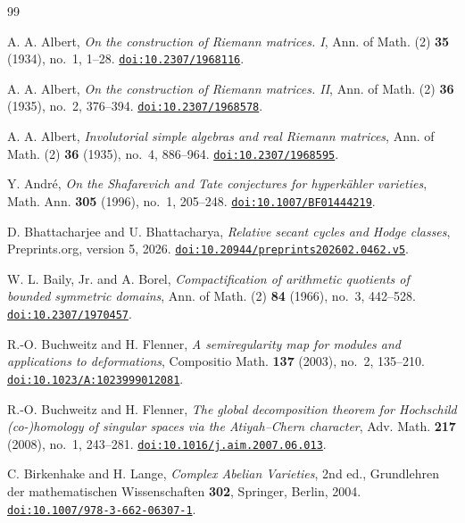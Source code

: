 \begin{thebibliography}{99}

A. A. Albert,
\emph{On the construction of Riemann matrices. I},
Ann. of Math. (2) \textbf{35} (1934), no.~1, 1--28.
\href{https://doi.org/10.2307/1968116}{\texttt{doi:10.2307/1968116}}.

A. A. Albert,
\emph{On the construction of Riemann matrices. II},
Ann. of Math. (2) \textbf{36} (1935), no.~2, 376--394.
\href{https://doi.org/10.2307/1968578}{\texttt{doi:10.2307/1968578}}.

A. A. Albert,
\emph{Involutorial simple algebras and real Riemann matrices},
Ann. of Math. (2) \textbf{36} (1935), no.~4, 886--964.
\href{https://doi.org/10.2307/1968595}{\texttt{doi:10.2307/1968595}}.

Y. Andr\'e,
\emph{On the Shafarevich and Tate conjectures for hyperk\"ahler varieties},
Math. Ann. \textbf{305} (1996), no.~1, 205--248.
\href{https://doi.org/10.1007/BF01444219}{\texttt{doi:10.1007/BF01444219}}.

D. Bhattacharjee and U. Bhattacharya,
\emph{Relative secant cycles and Hodge classes},
Preprints.org, version 5, 2026.
\href{https://doi.org/10.20944/preprints202602.0462.v5}{\texttt{doi:10.20944/preprints202602.0462.v5}}.

W. L. Baily, Jr. and A. Borel,
\emph{Compactification of arithmetic quotients of bounded symmetric domains},
Ann. of Math. (2) \textbf{84} (1966), no.~3, 442--528.
\href{https://doi.org/10.2307/1970457}{\texttt{doi:10.2307/1970457}}.

R.-O. Buchweitz and H. Flenner,
\emph{A semiregularity map for modules and applications to deformations},
Compositio Math. \textbf{137} (2003), no.~2, 135--210.
\href{https://doi.org/10.1023/A:1023999012081}{\texttt{doi:10.1023/A:1023999012081}}.

R.-O. Buchweitz and H. Flenner,
\emph{The global decomposition theorem for Hochschild (co-)homology of
singular spaces via the Atiyah--Chern character},
Adv. Math. \textbf{217} (2008), no.~1, 243--281.
\href{https://doi.org/10.1016/j.aim.2007.06.013}{\texttt{doi:10.1016/j.aim.2007.06.013}}.

C. Birkenhake and H. Lange,
\emph{Complex Abelian Varieties}, 2nd ed.,
Grundlehren der mathematischen Wissenschaften \textbf{302},
Springer, Berlin, 2004.
\href{https://doi.org/10.1007/978-3-662-06307-1}{\texttt{doi:10.1007/978-3-662-06307-1}}.


\end{thebibliography}
